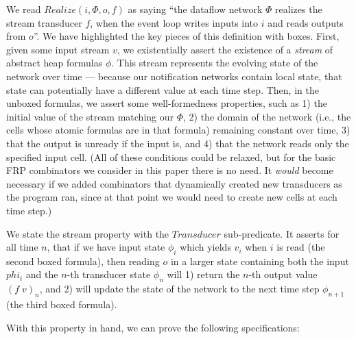 \documentclass[preprint,natbib]{sigplanconf}
\begin{document}
We read $Realize(i, \Phi, o, f)$ as saying ``the dataflow network
$\Phi$ realizes the stream transducer $f$, when the event loop writes
inputs into $i$ and reads outputs from $o$''. We have highlighted the
key pieces of this definition with boxes. First, given some input
stream $v$, we existentially assert the existence of a \emph{stream}
of abstract heap formulas $\phi$. This stream represents the evolving
state of the network over time --- because our notification networks
contain local state, that state can potentially have a different value
at each time step. Then, in the unboxed formulas, we assert some
well-formedness properties, such as 1) the initial value of the stream
matching our $\Phi$, 2) the domain of the network (i.e., the cells whose
atomic formulas are in that formula) remaining constant
over time, 3) that the output is unready if the input is, and 4) that
the network reads only the specified input cell. (All of these
conditions could be relaxed, but for the basic FRP combinators we
consider in this paper there is no need. It \emph{would} become
necessary if we added combinators that dynamically created new
transducers as the program ran, since at that point we would need to
create new cells at each time step.)

We state the stream property with the $Transducer$ sub-predicate. It
asserts for all time $n$, that if we have input state $\phi_i$ which
yields $v_i$ when $i$ is read (the second boxed formula), then 
reading $o$ in a larger state containing both the input $phi_i$ and the
$n$-th transducer state $\phi_n$ will 1) return the $n$-th output
value $(f\;v)_n$, and 2) will update the state of the network to 
the next time step $\phi_{n+1}$ (the third boxed formula). 

With this property in hand, we can prove the following specifications: 
\end{document}
